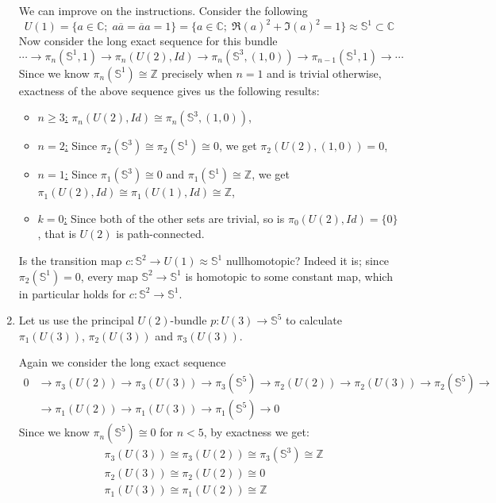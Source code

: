 \documentclass[a4paper, 12pt]{article}
\renewcommand{\S}{\mathbb{S}}
\newcommand{\Z}{\mathbb{Z}}
\newcommand{\C}{\mathbb{C}}
\newcommand{\iso}{\cong}
\newcommand{\homeo}{\approx}
\begin{document}
\begin{enumerate}[label=(\alph*)]
	We can improve on the instructions. Consider the following
	\[
	U(1) = \lbrace a \in \C ; \; a \overline{a} = \overline{a} a = 1 \rbrace = \lbrace a \in \C ; \; \Re(a)^2 + \Im(a)^2 = 1 \rbrace \homeo \S^1 \subset \C
	\]
	Now consider the long exact sequence for this bundle
	\[
	\cdots \xrightarrow{} \pi_n(\S^1, 1) \xrightarrow{} \pi_n(U(2), Id) \xrightarrow{} \pi_n(\S^3, (1, 0)) \xrightarrow{} \pi_{n-1}(\S^1, 1) \xrightarrow{} \cdots
	\]
	Since we know $\pi_n(\S^1) \iso \Z$ precisely when $n = 1$ and is trivial otherwise, exactness of the above sequence gives us the following results:
	\begin{itemize}
		\item \underline{$n \geq 3$:} $\pi_n(U(2), Id) \iso \pi_n(\S^3, (1, 0))$,
		\item \underline{$n = 2$:} Since $\pi_2(\S^3) \iso \pi_2(\S^1) \iso 0$, we get $\pi_2(U(2), (1, 0)) = 0$,
		\item \underline{$n = 1$:} Since $\pi_1(\S^3) \iso 0$ and $\pi_1(\S^1) \iso \Z$, we get $\pi_1(U(2), Id) \iso \pi_1(U(1), Id) \iso \Z$,
		\item \underline{$k = 0$:} Since both of the other sets are trivial, so is $\pi_0(U(2), Id) = \lbrace 0 \rbrace$, that is $U(2)$ is path-connected.
	\end{itemize}
	
	Is the transition map $c \colon \S^2 \to U(1) \homeo \S^1$ nullhomotopic? Indeed it is; since $\pi_2(\S^1) = 0$, every map $\S^2 \to \S^1$ is homotopic to some constant map, which in particular holds for $c \colon \S^2 \to \S^1$.
	
	\item Let us use the principal $U(2)$-bundle $p \colon U(3) \to \S^5$ to calculate $\pi_1(U(3))$, $\pi_2(U(3))$ and $\pi_3(U(3))$.
	
	Again we consider the long exact sequence
	\begin{align*}
	0 &\xrightarrow{} \pi_3(U(2)) \xrightarrow{} \pi_3(U(3)) \xrightarrow{} \pi_3(\S^5) \xrightarrow{} \pi_2(U(2)) \xrightarrow{} \pi_2(U(3)) \xrightarrow{} \pi_2(\S^5) \xrightarrow{} \\
	&\xrightarrow{} \pi_1(U(2)) \xrightarrow{} \pi_1(U(3)) \xrightarrow{} \pi_1(\S^5) \xrightarrow{} 0
	\end{align*}
	Since we know $\pi_n(\S^5) \iso 0$ for $n<5$, by exactness we get:
	\begin{align*}
	&\pi_3(U(3)) \iso \pi_3(U(2)) \iso \pi_3(\S^3) \iso \Z \\
	&\pi_2(U(3)) \iso \pi_2(U(2)) \iso 0 \\
	&\pi_1(U(3)) \iso \pi_1(U(2)) \iso \Z
	\end{align*}
	

\end{enumerate}
\end{document}
